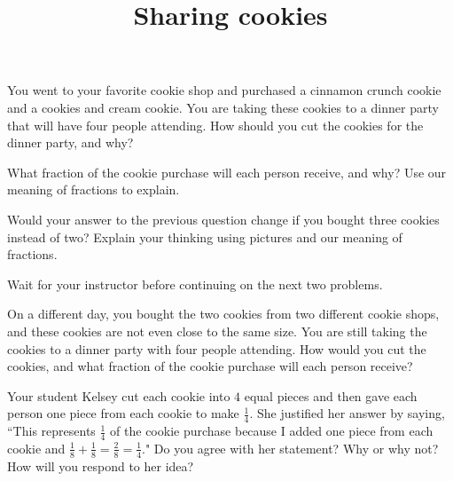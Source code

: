 \documentclass{ximera}
\title{Sharing cookies}
\begin{document}
\begin{abstract}\end{abstract}
\maketitle

\begin{problem}
You went to your favorite cookie shop and purchased a cinnamon crunch cookie and a cookies and cream cookie. You are taking these cookies to a dinner party that will have four people attending. How should you cut the cookies for the dinner party, and why?
\end{problem}


\begin{problem}
What fraction of the cookie purchase will each person receive, and why? Use our meaning of fractions to explain.
\end{problem}


\begin{problem}
Would your answer to the previous question change if you bought three cookies instead of two? Explain your thinking using pictures and our meaning of fractions.
\end{problem}

\vfill
Wait for your instructor before continuing on the next two problems.
\newpage

\begin{problem}
On a different day, you bought the two cookies from two different cookie shops, and these cookies are not even close to the same size. You are still taking the cookies to a dinner party with four people attending. How would you cut the cookies, and what fraction of the cookie purchase will each person receive?
\end{problem}


\begin{problem}
  Your student Kelsey cut each cookie into $4$ equal pieces and then gave each person one piece from each cookie to make $\frac{1}{4}$.  She justified her answer by saying, ``This represents $\frac{1}{4}$ of the cookie purchase because I added one piece from each cookie and   $\frac{1}{8}+\frac{1}{8}= \frac{2}{8} =\frac{1}{4}$."  Do you agree with her statement?  Why or why not?  How will you respond to her idea?
  
  
  
  
\end{problem}
\newpage
\end{document}
